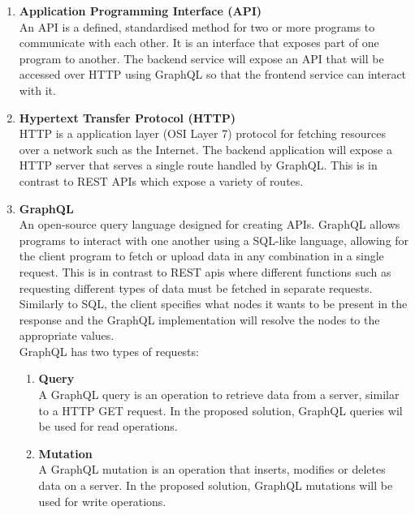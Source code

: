 \documentclass[../../main.tex]{subfiles}
\begin{document}
\begin{enumerate}
      \item \textbf{Application Programming Interface (API)}\\
            An API is a defined, standardised method for two or more programs to communicate
            with each other. It is an interface that exposes part of one program to another.
            The backend service will expose an API that will be accessed over HTTP using GraphQL
            so that the frontend service can interact with it.

      \item \textbf{Hypertext Transfer Protocol (HTTP) }\\
            HTTP is a application layer (OSI Layer 7) protocol for fetching
            resources over a network such as the Internet. The backend application
            will expose a HTTP server that serves a single route handled by GraphQL.
            This is in contrast to REST APIs which expose a variety of routes.

      \item \textbf{GraphQL}\\
            An open-source query language designed for creating APIs.
            GraphQL allows programs to interact with one another using a SQL-like language,
            allowing for the client program to fetch or upload data in any combination in a single request.
            This is in contrast to REST apis where different functions such as requesting different types of data
            must be fetched in separate requests.
            Similarly to SQL, the client specifies what nodes it wants to be present in the response
            and the GraphQL implementation will resolve the nodes to the appropriate values.\\

            GraphQL has two types of requests:

            \begin{enumerate}
                  \item \textbf{Query}\\
                        A GraphQL query is an operation to retrieve data from a server, similar to a HTTP GET request.
                        In the proposed solution, GraphQL queries wil be used for read operations.

                  \item \textbf{Mutation}\\
                        A GraphQL mutation is an operation that inserts, modifies or deletes data on a server.
                        In the proposed solution, GraphQL mutations will be used for write operations.
            \end{enumerate}


\end{enumerate}
\end{document}
